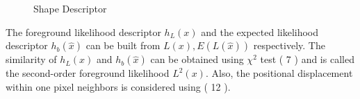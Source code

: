 \documentclass[conference]{IEEEtran}
\begin{document}
\begin{figure}[!t]
  \centering
  \label{fig:80}
  \hfill
  \caption{Shape Descriptor}
\end{figure}
The foreground likelihood descriptor \begin{math} h_L(x) \end{math} and the expected likelihood descriptor
\begin{math} h_b(\hat{x}) \end{math} can be built from \begin{math} L(x), E(L(\hat{x})) \end{math} respectively.
The similarity of \begin{math} h_L(x) \end{math}  and \begin{math} h_b(\hat{x}) \end{math} can be obtained using 
\begin{math} \chi ^2 \end{math} test ( 7 ) and is called the second-order foreground likelihood \begin{math} L^2(x) \end{math}.
Also, the positional displacement within one pixel neighbors is considered using ( 12 ).
\end{document}
